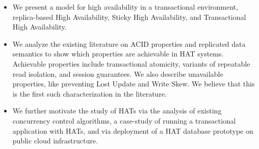 \begin{itemize}
\item We present a model for high availability in a transactional
  environment, replica-based High Availability, Sticky High
  Availability, and Transactional High Availability.

\item We analyze the existing literature on ACID properties and
  replicated data semantics to show which properties are achievable in
  HAT systems. Achievable properties include transactional atomicity,
  variants of repeatable read isolation, and session guarantees. We
  also describe unavailable properties, like preventing Lost Update
  and Write Skew. We believe that this is the first such
  characterization in the literature.

\item We further motivate the study of HATs via the analysis of
  existing concurrency control algorithms, a case-study of running a
  transactional application with HATs, and via deployment of a HAT
  database prototype on public cloud infrastructure.
\end{itemize}

